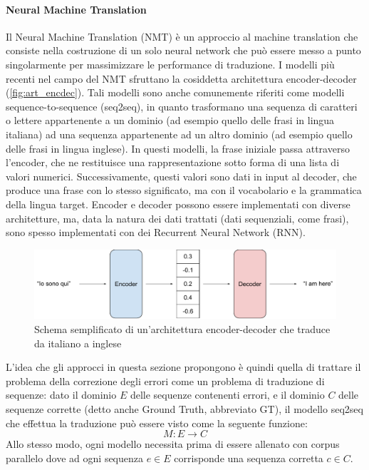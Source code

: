 \paragraph{Neural Machine Translation} Il Neural Machine Translation (NMT) è un approccio al machine translation che consiste nella costruzione di un solo neural network che può essere messo a punto singolarmente per massimizzare le performance di traduzione\cite{nmtdef}. I modelli più recenti nel campo del NMT sfruttano la cosiddetta architettura encoder-decoder (\autoref{fig:art_encdec}). Tali modelli sono anche comunemente riferiti come modelli sequence-to-sequence (seq2seq), in quanto trasformano una sequenza di caratteri o lettere appartenente a un dominio (ad esempio quello delle frasi in lingua italiana) ad una sequenza appartenente ad un altro dominio (ad esempio quello delle frasi in lingua inglese). In questi modelli, la frase iniziale passa attraverso l'encoder, che ne restituisce una rappresentazione sotto forma di una lista di valori numerici. Successivamente, questi valori sono dati in input al decoder, che produce una frase con lo stesso significato, ma con il vocabolario e la grammatica della lingua target. Encoder e decoder possono essere implementati con diverse architetture, ma, data la natura dei dati trattati (dati sequenziali, come frasi), sono spesso implementati con dei Recurrent Neural Network (RNN).


\begin{figure}[H]
\centering
\includegraphics[width=\textwidth]{immagini/stato_arte/encoder_decoder}
\caption{Schema semplificato di un'architettura encoder-decoder che traduce da italiano a inglese}
\label{fig:art_encdec}
\end{figure}

L'idea che gli approcci in questa sezione propongono è quindi quella di trattare il problema della correzione degli errori come un problema di traduzione di sequenze: dato il dominio $E$ delle sequenze contenenti errori, e il dominio $C$ delle sequenze corrette (detto anche Ground Truth, abbreviato GT), il modello seq2seq che effettua la traduzione può essere visto come la seguente funzione:
\begin{equation}
M: E \rightarrow C
\end{equation}
Allo stesso modo, ogni modello necessita prima di essere allenato con corpus parallelo dove ad ogni sequenza $e \in E$ corrisponde una sequenza corretta $c \in C$.

